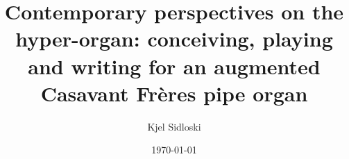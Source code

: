 \documentclass[12pt,twoside,maitrise]{dms_ks}
\theoremstyle{definition}
\begin{document}
\entetedynamique




\title{Contemporary perspectives on the hyper-organ: conceiving, playing and writing for an augmented Casavant Frères pipe organ}

\author{Kjel Sidloski}



\date{\today} %










\end{document}
